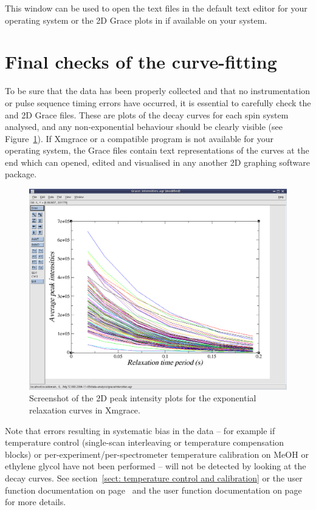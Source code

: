 This window can be used to open the text files in the default text editor for your operating system or the 2D Grace plots in  if available on your system.




\section{Final checks of the curve-fitting}

To be sure that the data has been properly collected and that no instrumentation or pulse sequence timing errors have occurred, it is essential to carefully check the  and  2D Grace files.  These are plots of the decay curves for each spin system analysed, and any non-exponential behaviour should be clearly visible (see Figure~\ref{fig: screenshot: xmgrace peak intensities}).  If Xmgrace or a compatible program is not available for your operating system, the Grace files contain text representations of the curves at the end which can opened, edited and visualised in any another 2D graphing software package.
 
\begin{figure}
\centerline{\includegraphics[width=\textwidth, bb=14 14 923 724]{graphics/screenshots/xmgrace_peak_intensities}}
\caption[Peak intensity 2D plot xmgrace screenshot]{Screenshot of the 2D peak intensity plots for the exponential relaxation curves in Xmgrace.}\label{fig: screenshot: xmgrace peak intensities}
\end{figure}

Note that errors resulting in systematic bias in the data -- for example if temperature control (single-scan interleaving or temperature compensation blocks) or per-experiment/per-spectrometer temperature calibration on MeOH or ethylene glycol have not been performed -- will not be detected by looking at the decay curves.  See section~\ref{sect: temperature control and calibration} or the  user function documentation on page~\pageref{uf: relax_data.temp_calibration} and the  user function documentation on page~\pageref{uf: relax_data.temp_control} for more details.
